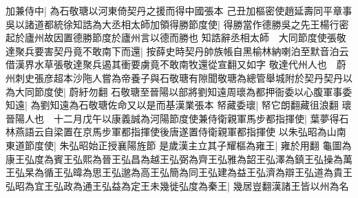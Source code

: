 加兼侍中|{
	為石敬瑭以河東倚契丹之援而得中國張本}
己丑加樞密使趙延壽同平章事吳以諸道都統徐知誥為大丞相太師加領得勝節度使|{
	得勝當作德勝吳之先王楊行密起於廬州故因置德勝節度於廬州言以德而勝也}
知誥辭丞相太師　大同節度使張敬達聚兵要害契丹竟不敢南下而還|{
	按薛史時契丹帥族帳自黑榆林納喇泊至默音泊云借漢界水草張敬達聚兵遏其衝要虜竟不敢南牧還從宣翻又如字}
敬達代州人也　蔚州刺史張彦超本沙陁人嘗為帝養子與石敬瑭有隙聞敬瑭為總管舉城附於契丹契丹以為大同節度使|{
	蔚紆勿翻}
石敬瑭至晉陽以部將劉知遠周瓌為都押衙委以心腹軍事委知遠|{
	為劉知遠為石敬瑭佐命又以是而基漢業張本}
帑藏委瓌|{
	帑它朗翻藏徂浪翻}
瓌晉陽人也　十二月戊午以康義誠為河陽節度使兼侍衛親軍馬步都指揮使|{
	葉夢得石林燕語云自梁置在京馬步軍都指揮使後唐遂置侍衛親軍都指揮使}
以朱弘昭為山南東道節度使|{
	朱弘昭始正授襄陽旌節}
是歲漢主立其子耀樞為雍王|{
	雍於用翻}
龜圖為康王弘度為賓王弘熙為晉王弘昌為越王弘弼為齊王弘雅為韶王弘澤為鎮王弘操為萬王弘杲為循王弘暐為思王弘邈為高王弘簡為同王弘建為益王弘濟為辯王弘道為貴王弘昭為宜王弘政為通王弘益為定王未幾徙弘度為秦王|{
	幾居豈翻漢諸王皆以州為名}


